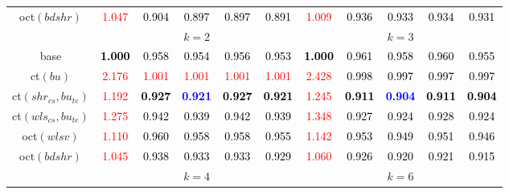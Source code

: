 \begin{tabular}[t]{c|>{}cccc>{}c|ccccc}
oct$(bdshr)$ & \textcolor{red}{1.047} & \textcolor{black}{0.904} & \textcolor{black}{0.897} & \textcolor{black}{0.897} & \textcolor{black}{0.891} & \textcolor{red}{1.009} & \textcolor{black}{0.936} & \textcolor{black}{0.933} & \textcolor{black}{0.934} & \textcolor{black}{0.931}\\
\addlinespace[0.3em]
\multicolumn{1}{c}{} & \multicolumn{5}{c}{\textbf{$k = 2$}} & \multicolumn{5}{c}{\textbf{$k = 3$}}\\
base & \textcolor{black}{\textbf{1.000}} & \textcolor{black}{0.958} & \textcolor{black}{0.954} & \textcolor{black}{0.956} & \textcolor{black}{0.953} & \textcolor{black}{\textbf{1.000}} & \textcolor{black}{0.961} & \textcolor{black}{0.958} & \textcolor{black}{0.960} & \textcolor{black}{0.955}\\
ct$(bu)$ & \textcolor{red}{2.176} & \textcolor{red}{1.001} & \textcolor{red}{1.001} & \textcolor{red}{1.001} & \textcolor{red}{1.001} & \textcolor{red}{2.428} & \textcolor{black}{0.998} & \textcolor{black}{0.997} & \textcolor{black}{0.997} & \textcolor{black}{0.997}\\
ct$(shr_{cs}, bu_{te})$ & \textcolor{red}{1.192} & \textcolor{black}{\textbf{0.927}} & \textcolor{blue}{\textbf{0.921}} & \textcolor{black}{\textbf{0.927}} & \textcolor{black}{\textbf{0.921}} & \textcolor{red}{1.245} & \textcolor{black}{\textbf{0.911}} & \textcolor{blue}{\textbf{0.904}} & \textcolor{black}{\textbf{0.911}} & \textcolor{black}{\textbf{0.904}}\\
ct$(wls_{cs}, bu_{te})$ & \textcolor{red}{1.275} & \textcolor{black}{0.942} & \textcolor{black}{0.939} & \textcolor{black}{0.942} & \textcolor{black}{0.939} & \textcolor{red}{1.348} & \textcolor{black}{0.927} & \textcolor{black}{0.924} & \textcolor{black}{0.928} & \textcolor{black}{0.924}\\
oct$(wlsv)$ & \textcolor{red}{1.110} & \textcolor{black}{0.960} & \textcolor{black}{0.958} & \textcolor{black}{0.958} & \textcolor{black}{0.955} & \textcolor{red}{1.142} & \textcolor{black}{0.953} & \textcolor{black}{0.949} & \textcolor{black}{0.951} & \textcolor{black}{0.946}\\
oct$(bdshr)$ & \textcolor{red}{1.045} & \textcolor{black}{0.938} & \textcolor{black}{0.933} & \textcolor{black}{0.933} & \textcolor{black}{0.929} & \textcolor{red}{1.060} & \textcolor{black}{0.926} & \textcolor{black}{0.920} & \textcolor{black}{0.921} & \textcolor{black}{0.915}\\
\addlinespace[0.3em]
\multicolumn{1}{c}{} & \multicolumn{5}{c}{\textbf{$k = 4$}} & \multicolumn{5}{c}{\textbf{$k = 6$}}\\

\end{tabular}
